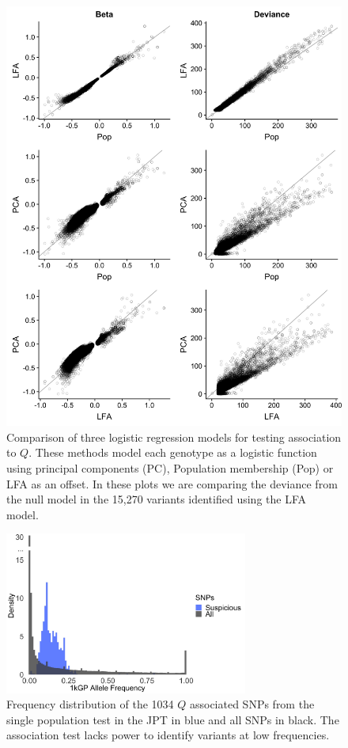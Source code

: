 \documentclass[9pt,lineno]{template}
\begin{document}
\begin{figure}
\centering
\includegraphics[width=13cm,keepaspectratio]{../Figures/fits_Significant_Positions_CompareModels.jpg}
\caption{Comparison of three logistic regression models for testing association to $Q$.
These methods model each genotype as a logistic function using principal components (PC), Population membership (Pop) or LFA as an offset.
In these plots we are comparing the deviance from the null model in the 15,270 variants identified using the LFA model.}  
\label{CompareModel}
\end{figure}

\begin{figure}
\centering
\includegraphics[width=8cm,keepaspectratio]{../Figures/histogram_of_sig_snps.jpg}
\caption{Frequency distribution of the 1034 $Q$ associated SNPs from the single population test in the JPT in blue and all SNPs in black. The association test lacks power to identify variants at low frequencies.}  
\label{histogram_of_sig_snps}
\end{figure}
\end{document}
